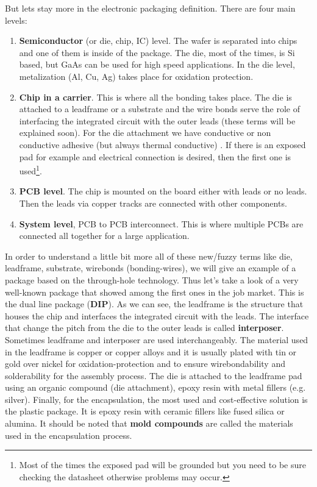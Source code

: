 \documentclass[final]{cubedoc}
\begin{document}
	But lets stay more in the electronic packaging definition. There are four main levels:
	
	\begin{enumerate}
		\item \textbf{Semiconductor} (or die, chip, IC) level. The wafer is separated into chips and one of them is inside of the package. The die, most of the times, is Si based, but GaAs can be used for high speed applications. In the die level, metalization (Al, Cu, Ag) takes place for oxidation protection.
		\item \textbf{Chip in a carrier}. This is where all the bonding takes place. The die is attached to a leadframe or a substrate  and the wire bonds serve the role of interfacing the integrated circuit with the outer leads (these terms will be explained soon). For the die attachment we have conductive or non conductive adhesive (but always thermal conductive) . If there is an exposed pad for example and electrical connection is desired, then the first one is used\footnote{Most of the times the exposed pad will be grounded but you need to be sure checking the datasheet otherwise problems may occur.}. 
		\item \textbf{PCB level}. The chip is mounted on the board either with leads or no leads. Then the leads via copper tracks are connected with other components.
		\item \textbf{System level}, PCB to PCB interconnect. This is where multiple PCBs are connected all together for a large application.
	\end{enumerate}
	
	In order to understand a little bit more all of these new/fuzzy terms like die, leadframe, substrate, wirebonds (bonding-wires), we will give an example of a package based on the through-hole technology. Thus let's take a look of a very well-known package that showed among the first ones in the job market. This is the dual line package (\textbf{DIP}). As we can see, the leadframe is the structure that houses the chip and interfaces the integrated circuit with the leads. The interface that change the pitch from the die to the outer leads is called \textbf{interposer}. Sometimes leadframe and interposer are used interchangeably. The material used in the leadframe is copper or copper alloys and it is usually plated with tin or gold over nickel for oxidation-protection and to ensure wirebondability and solderability for the assembly process. The die is attached to the leadframe pad using an organic compound (die attachment), epoxy resin with metal fillers (e.g. silver). Finally, for the encapsulation, the most used and cost-effective solution is the plastic package. It is epoxy resin with ceramic fillers like fused silica or alumina. It should be noted that \textbf{mold compounds} are called the materials used in the encapsulation process. 
	
\end{document}

